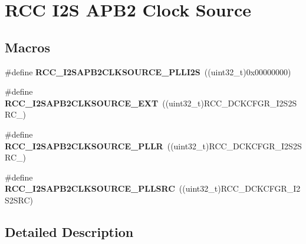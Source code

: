 \hypertarget{group___r_c_c_ex___i2_s_a_p_b2___clock___source}{}\section{R\+CC I2S A\+P\+B2 Clock Source}
\label{group___r_c_c_ex___i2_s_a_p_b2___clock___source}
\subsection*{Macros}
\begin{DoxyCompactItemize}
\item 
\#define {\bfseries R\+C\+C\+\_\+\+I2\+S\+A\+P\+B2\+C\+L\+K\+S\+O\+U\+R\+C\+E\+\_\+\+P\+L\+L\+I2S}~((uint32\+\_\+t)0x00000000)\hypertarget{group___r_c_c_ex___i2_s_a_p_b2___clock___source_ga59c64c8a05c7f3b5c2fdf607bffc5647}{}\label{group___r_c_c_ex___i2_s_a_p_b2___clock___source_ga59c64c8a05c7f3b5c2fdf607bffc5647}

\item 
\#define {\bfseries R\+C\+C\+\_\+\+I2\+S\+A\+P\+B2\+C\+L\+K\+S\+O\+U\+R\+C\+E\+\_\+\+E\+XT}~((uint32\+\_\+t)R\+C\+C\+\_\+\+D\+C\+K\+C\+F\+G\+R\+\_\+\+I2\+S2\+S\+R\+C\+\_)\hypertarget{group___r_c_c_ex___i2_s_a_p_b2___clock___source_ga065c1ffbe2fc800a986aa269638bfd61}{}\label{group___r_c_c_ex___i2_s_a_p_b2___clock___source_ga065c1ffbe2fc800a986aa269638bfd61}

\item 
\#define {\bfseries R\+C\+C\+\_\+\+I2\+S\+A\+P\+B2\+C\+L\+K\+S\+O\+U\+R\+C\+E\+\_\+\+P\+L\+LR}~((uint32\+\_\+t)R\+C\+C\+\_\+\+D\+C\+K\+C\+F\+G\+R\+\_\+\+I2\+S2\+S\+R\+C\+\_)\hypertarget{group___r_c_c_ex___i2_s_a_p_b2___clock___source_ga3ccb32cbe515cc077c71a4e3395136f4}{}\label{group___r_c_c_ex___i2_s_a_p_b2___clock___source_ga3ccb32cbe515cc077c71a4e3395136f4}

\item 
\#define {\bfseries R\+C\+C\+\_\+\+I2\+S\+A\+P\+B2\+C\+L\+K\+S\+O\+U\+R\+C\+E\+\_\+\+P\+L\+L\+S\+RC}~((uint32\+\_\+t)R\+C\+C\+\_\+\+D\+C\+K\+C\+F\+G\+R\+\_\+\+I2\+S2\+S\+RC)\hypertarget{group___r_c_c_ex___i2_s_a_p_b2___clock___source_ga181219ccef3501a8cc4e1fca4b7d5a9a}{}\label{group___r_c_c_ex___i2_s_a_p_b2___clock___source_ga181219ccef3501a8cc4e1fca4b7d5a9a}

\end{DoxyCompactItemize}


\subsection{Detailed Description}
